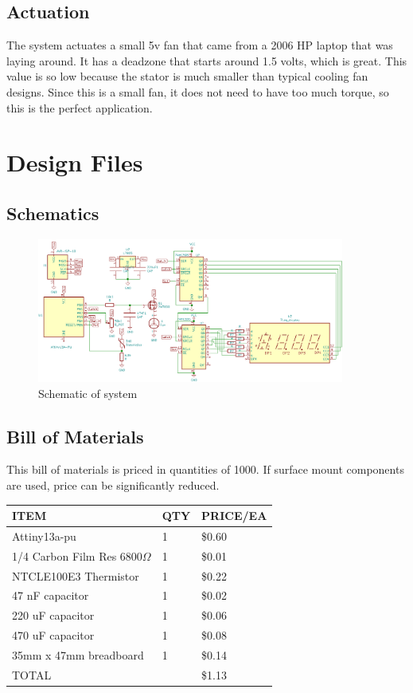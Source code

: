 \documentclass{hitec}
\begin{document}
\subsection{Actuation}
The system actuates a small 5v fan that came from a 2006 HP laptop that was laying around. It has a deadzone that starts around 1.5 volts, which is great. This value is so low because the stator is much smaller than typical cooling fan designs. Since this is a small fan, it does not need to have too much torque, so this is the perfect application.

\section{Design Files}

\subsection{Schematics}

\begin{figure}[H]
\centering
\includegraphics[width=0.9\textwidth]{schem.png}
\caption{Schematic of system}
\label{fig:schem}
\end{figure}
\subsection{Bill of Materials}
This bill of materials is priced in quantities of 1000. If surface mount components are used, price can be significantly reduced.\\
\begin{tabular}{|l|l|l|}
\hline	

 ITEM								&	QTY	&	PRICE/EA \\ \hline
 Attiny13a-pu						&	1	&	\$0.60 \\ \hline
 1/4 Carbon Film Res 6800$\Omega$ 	&	1	&	\$0.01 \\ \hline
 NTCLE100E3	 Thermistor				&	1	&	\$0.22	\\	\hline
 47 nF capacitor						&	1	&	\$0.02 \\ \hline
 220 uF capacitor					&	1	&	\$0.06	\\ \hline
 470 uF capacitor					&	1	&	\$0.08	\\ \hline
 35mm x 47mm breadboard				&	1	&	\$0.14 \\ \hline\hline
 TOTAL								&		&	\$1.13 \\ \hline

\end{tabular}
\end{document}
